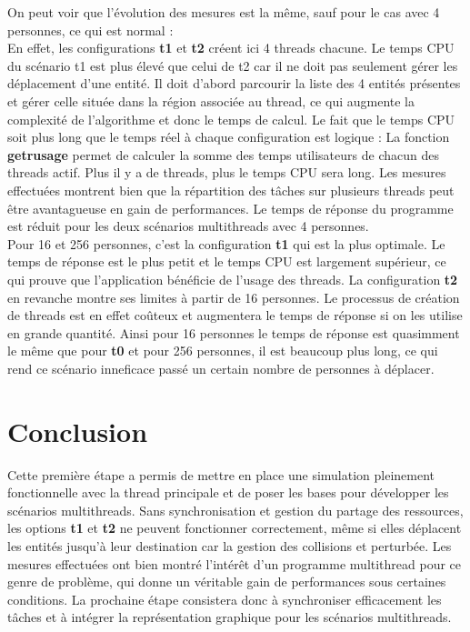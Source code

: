 \documentclass[11pt]{article} %
\begin{document}
On peut voir que l'évolution des mesures est la même, sauf pour le cas avec 4 personnes, ce qui est normal : \\
En effet, les configurations \textbf{t1} et \textbf{t2} créent ici 4 threads chacune. Le temps CPU du scénario t1 est plus élevé que celui de t2 car il ne doit pas seulement gérer les déplacement d'une entité. Il doit d'abord parcourir la liste des 4 entités présentes et gérer celle située dans la région associée au thread, ce qui augmente la complexité de l'algorithme et donc le temps de calcul. 
Le fait que le temps CPU soit plus long que le temps réel à chaque configuration est logique : La fonction \textbf{getrusage} permet de calculer la somme des temps utilisateurs de chacun des threads actif. Plus il y a de threads, plus le temps CPU sera long. Les mesures effectuées montrent bien que la répartition des tâches sur plusieurs threads peut être avantagueuse en gain de performances. Le temps de réponse du programme est réduit pour les deux scénarios multithreads avec 4 personnes. \\
Pour 16 et 256 personnes, c'est la configuration \textbf{t1} qui est la plus optimale. Le temps de réponse est le plus petit et le temps CPU est largement supérieur, ce qui prouve que l'application bénéficie de l'usage des threads. La configuration \textbf{t2} en revanche montre ses limites à partir de 16 personnes. Le processus de création de threads est en effet coûteux et augmentera le temps de réponse si on les utilise en grande quantité. Ainsi pour 16 personnes le temps de réponse est quasimment le même que pour \textbf{t0} et pour 256 personnes, il est beaucoup plus long, ce qui rend ce scénario inneficace passé un certain nombre de personnes à déplacer.

\section{Conclusion}
Cette première étape a permis de mettre en place une simulation pleinement fonctionnelle avec la thread principale et de poser les bases pour développer les scénarios multithreads. Sans synchronisation et gestion du partage des ressources, les options \textbf{t1} et \textbf{t2} ne peuvent fonctionner correctement, même si elles déplacent les entités jusqu'à leur destination car la gestion des collisions et perturbée. 
Les mesures effectuées ont bien montré l'intérêt d'un programme multithread pour ce genre de problème, qui donne un véritable gain de performances sous certaines conditions. La prochaine étape consistera donc à synchroniser efficacement les tâches et à intégrer la représentation graphique pour les scénarios multithreads.
\end{document}
